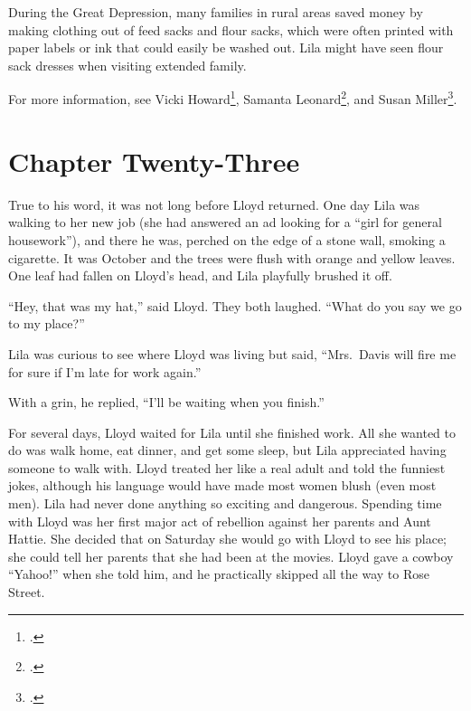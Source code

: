 \documentclass[
  letterpaper,
]{book}
\begin{document}
During the Great Depression, many families in rural areas saved money by
making clothing out of feed sacks and flour sacks, which were often
printed with paper labels or ink that could easily be washed out. Lila
might have seen flour sack dresses when visiting extended family.

For more information, see Vicki Howard\footnote{.}, Samanta
Leonard\footnote{.}, and Susan
Miller\footnote{.}.


\chapter{Chapter Twenty-Three}\label{chapter-twenty-three}

True to his word, it was not long before Lloyd returned. One day Lila
was walking to her new job (she had answered an ad looking for a ``girl
for general housework''), and there he was, perched on the edge of a
stone wall, smoking a cigarette. It was October and the trees were flush
with orange and yellow leaves. One leaf had fallen on Lloyd's head, and
Lila playfully brushed it off.

``Hey, that was my hat,'' said Lloyd. They both laughed. ``What do you
say we go to my place?''

Lila was curious to see where Lloyd was living but said, ``Mrs.~Davis
will fire me for sure if I'm late for work again.''

With a grin, he replied, ``I'll be waiting when you finish.''

For several days, Lloyd waited for Lila until she finished work. All she
wanted to do was walk home, eat dinner, and get some sleep, but Lila
appreciated having someone to walk with. Lloyd treated her like a real
adult and told the funniest jokes, although his language would have made
most women blush (even most men). Lila had never done anything so
exciting and dangerous. Spending time with Lloyd was her first major act
of rebellion against her parents and Aunt Hattie. She decided that on
Saturday she would go with Lloyd to see his place; she could tell her
parents that she had been at the movies. Lloyd gave a cowboy ``Yahoo!''
when she told him, and he practically skipped all the way to Rose
Street.
\end{document}
